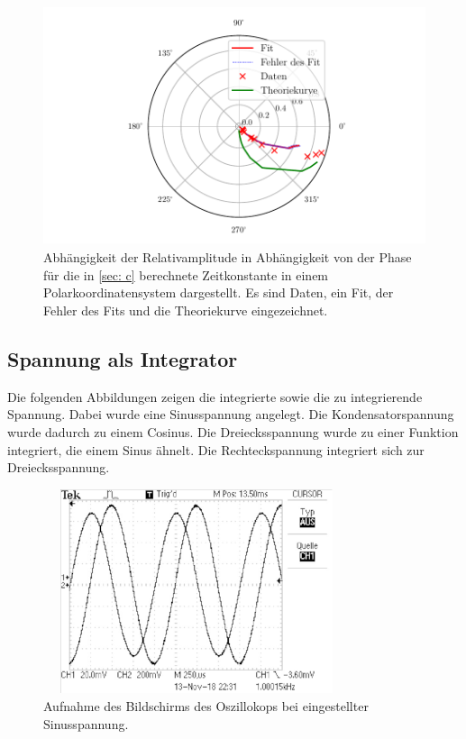 \begin{figure}
  \centering
  \includegraphics[width=12cm, height=7cm]{build/plotd3.pdf}
  \caption{Abhängigkeit der Relativamplitude in Abhängigkeit von der Phase für die in \ref{sec: c} 
  berechnete Zeitkonstante in einem Polarkoordinatensystem dargestellt. Es sind Daten, ein Fit, der Fehler
  des Fits und die Theoriekurve eingezeichnet.}
  \label{fig: plotd3}
\end{figure}

\subsection{Spannung als Integrator}
Die folgenden Abbildungen zeigen die integrierte sowie die zu integrierende Spannung.
Dabei wurde eine Sinusspannung angelegt. Die Kondensatorspannung wurde dadurch zu einem Cosinus. Die Dreiecksspannung wurde zu einer Funktion integriert, die einem Sinus ähnelt. Die Rechteckspannung integriert sich zur Dreiecksspannung. \newline \newline \newline %
\begin{figure}
  \centering
  \includegraphics[width=9cm, height=6cm]{build/integrator1.pdf}
  \caption{Aufnahme des Bildschirms des Oszillokops bei eingestellter Sinusspannung.}
  \label{fig: sinus}
\end{figure}

